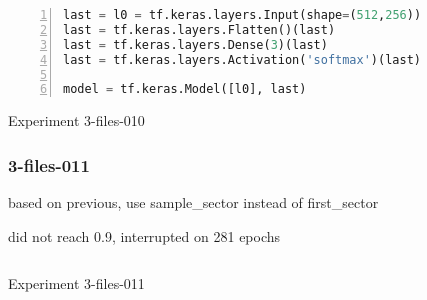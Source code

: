 


\noindent
\begin{algorithm}
\begin{lstlisting}[language=Python, frame=single, numbers=left]
last = l0 = tf.keras.layers.Input(shape=(512,256))
last = tf.keras.layers.Flatten()(last)
last = tf.keras.layers.Dense(3)(last)
last = tf.keras.layers.Activation('softmax')(last)

model = tf.keras.Model([l0], last)
\end{lstlisting}
\caption{\label{alg:3-files-010}Experiment 3-files-010}
\end{algorithm}

\subsubsection{3-files-011}

based on previous, use sample\_sector instead of first\_sector

did not reach 0.9, interrupted on 281 epochs



\noindent
\begin{algorithm}
\begin{lstlisting}[language=Python, frame=single, numbers=left]
\end{lstlisting}
\caption{\label{alg:3-files-011}Experiment 3-files-011}
\end{algorithm}

